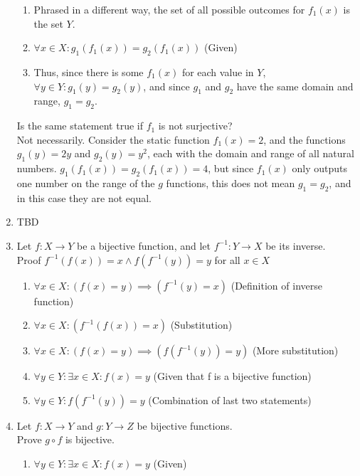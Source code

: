 \documentclass{article}
\begin{document}
\begin{enumerate}
\begin{enumerate}
                \item Phrased in a different way, the set of all possible outcomes for $f_1(x)$ is the set $Y$.
                \item $\forall x \in X: g_1(f_1(x)) = g_2(f_1(x))$ (Given)
                \item Thus, since there is some $f_1(x)$ for each value in $Y$,
                    $\forall y \in Y: g_1(y) = g_2(y)$, and since $g_1$ and
                    $g_2$ have the same domain and range, $g_1=g_2$.
            \end{enumerate}
            Is the same statement true if $f_1$ is not surjective? \\ 
            Not necessarily.  Consider the static function $f_1(x) = 2$, and
            the functions $g_1(y) = 2y$ and $g_2(y) = y^2$, each with the
            domain and range of all natural numbers. $g_1(f_1(x)) = g_2(f_1(x))
            = 4$, but since $f_1(x)$ only outputs one number on the range of
            the $g$ functions, this does not mean $g_1 = g_2$, and in this case
            they are not equal.
        \item TBD
        \item Let $f: X \rightarrow Y$ be a bijective function, and let
            $f^{-1}: Y \rightarrow X$ be its inverse. \\
            Proof $f^{-1}(f(x)) = x \land f(f^{-1}(y)) = y$ for all $x \in X$
            \begin{enumerate}
                \item $\forall x \in X: (f(x) = y) \implies (f^{-1}(y) = x)$ (Definition of inverse function)
                \item $\forall x \in X: (f^{-1}(f(x)) = x)$ (Substitution)
                \item $\forall x \in X: (f(x) = y) \implies (f(f^{-1}(y)) = y)$ (More substitution)
                \item $\forall y \in Y: \exists x \in X: f(x) = y$ (Given that f is a bijective function)
                \item $\forall y \in Y: f(f^{-1}(y)) = y$ (Combination of last two statements)
            \end{enumerate}
        \item Let $f: X \rightarrow Y$ and $g: Y \rightarrow Z$ be bijective functions. \\
            Prove $g \circ f$ is bijective.
            \begin{enumerate}
                \item $\forall y \in Y: \exists x \in X: f(x) = y$ (Given)

\end{enumerate}
\end{enumerate}
\end{document}

